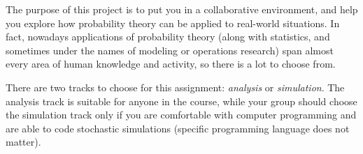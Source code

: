 \documentclass[oneside,11pt]{amsart}
\begin{document}
\medskip

The purpose of this project is to put you in a collaborative environment,
and help you explore how probability theory can be applied 
to real-world situations. 
In fact, nowadays applications of probability theory (along with statistics,
and sometimes under the names of modeling or operations research) 
span almost every area of human knowledge and activity, so there is a lot to choose from.

There are two tracks to choose for this assignment: \emph{analysis} or \emph{simulation}.
The analysis track is suitable for anyone in the course, while
your group should choose the simulation track only if you
are comfortable with computer programming
and are able to code stochastic simulations (specific programming language does not matter).
\end{document}
